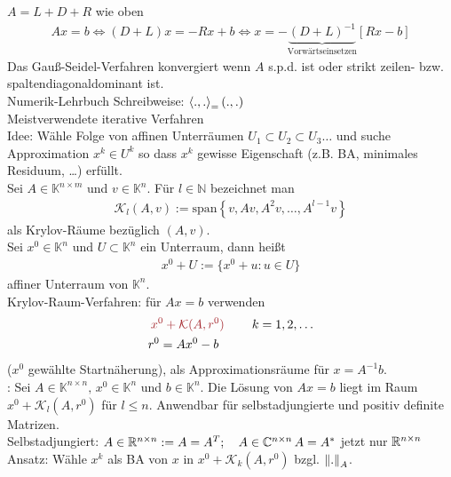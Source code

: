 $A = L + D + R$ wie oben
\begin{align*}
  Ax = b \Leftrightarrow (D + L)x = -Rx + b \Leftrightarrow x = - \underbrace{(D+L)^{-1}}_{\text{Vorwärtseinsetzen}}[Rx - b]
\end{align*}
\satz Das Gauß-Seidel-Verfahren konvergiert wenn $A$ s.p.d. ist oder strikt zeilen- bzw. spaltendiagonaldominant ist.\\
\beweis Numerik-Lehrbuch
Schreibweise: $\left\langle ., . \right\rangle_ = (.,.)$\\
Meistverwendete iterative Verfahren\\
Idee: Wähle Folge von affinen Unterräumen $U_1 \subset U_2 \subset U_3 \ldots$ und suche 
Approximation $x^k \in U^k$ so dass $x^k$ gewisse Eigenschaft (z.B. BA, minimales Residuum, \ldots) erfüllt.\\
 Sei $A \in \mathbb{K}^{n \times m}$ und $v \in \mathbb{K}^n$. Für $l \in \mathbb{N}$ bezeichnet man
\begin{align*}
  \mathcal{K}_l(A,v) := \mathrm{span} \left \{ v, Av, A^2v, \ldots, A^{l-1}v \right \}
\end{align*}
als Krylov-Räume bezüglich $(A,v)$.\\
 Sei $x^0 \in \mathbb{K}^n$ und $U \subset \mathbb{K}^n$ ein Unterraum, dann heißt
\begin{align*}
  x^0 + U := \{x^0 + u: u \in U\}
\end{align*}
affiner Unterraum von $\mathbb{K}^n$.\\
Krylov-Raum-Verfahren: für $Ax = b$ verwenden
\begin{align*}
  & \mathbin{\textcolor{rot}{x^0 + \mathcal{K}(A,r^0)}} \qquad k=1,2,\ldots\\
  & r^0 = Ax^0 - b
\end{align*}
($x^0$ gewählte Startnäherung), als Approximationsräume für $x = A^{-1}b$.\\
\satz: Sei $A \in \mathbb{K}^{n \times n},\,x^0 \in \mathbb{K}^n$ und $b \in \mathbb{K}^n$. Die Lösung von
$Ax = b$ liegt im Raum $x^0 + \mathcal{K}_l(A,r^0)$ für $l \leq n$.
Anwendbar für selbstadjungierte und positiv definite Matrizen.\\
Selbstadjungiert: $A \in \mathbb{R}^{n \times n} := A = A^T; \quad A \in \mathbb{C}^{n \times n}\, A = A^*$ jetzt nur $\mathbb{R}^{n \times n}$\\
Ansatz: Wähle $x^k$ als BA von $x$ in $x^0 + \mathcal{K}_k(A,r^0)$ bzgl. $\left\lVert . \right\rVert_A$.\\
